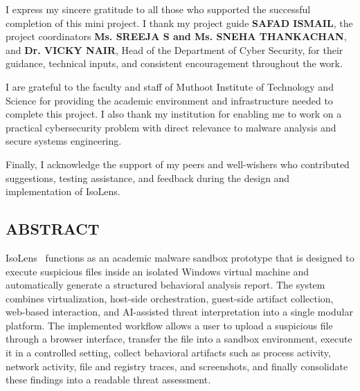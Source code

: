 \documentclass[a4paper,12pt,oneside]{report}
\begin{document}
\noindent
I express my sincere gratitude to all those who supported the successful completion of this mini project. I thank my project guide \textbf{SAFAD ISMAIL}, the project coordinators \textbf{Ms. SREEJA S and Ms. SNEHA THANKACHAN}, and \textbf{Dr. VICKY NAIR}, Head of the Department of Cyber Security, for their guidance, technical inputs, and consistent encouragement throughout the work.

\par

\par

I are grateful to the faculty and staff of Muthoot Institute of Technology and Science for providing the academic environment and infrastructure needed to complete this project. I also thank my institution for enabling me to work on a practical cybersecurity problem with direct relevance to malware analysis and secure systems engineering.

\par

\par

Finally, I acknowledge the support of my peers and well-wishers who contributed suggestions, testing assistance, and feedback during the design and implementation of IsoLens.

\newpage
{}
\setcounter{page}{2}
\thispagestyle{plain}
\begin{center}
\section*{ABSTRACT}
\end{center}
\par

IsoLens~\cite{isolens} functions as an academic malware sandbox prototype that is designed to execute suspicious files inside an isolated Windows virtual machine and automatically generate a structured behavioral analysis report. The system combines virtualization, host-side orchestration, guest-side artifact collection, web-based interaction, and AI-assisted threat interpretation into a single modular platform. The implemented workflow allows a user to upload a suspicious file through a browser interface, transfer the file into a sandbox environment, execute it in a controlled setting, collect behavioral artifacts such as process activity, network activity, file and registry traces, and screenshots, and finally consolidate these findings into a readable threat assessment.
\end{document}

